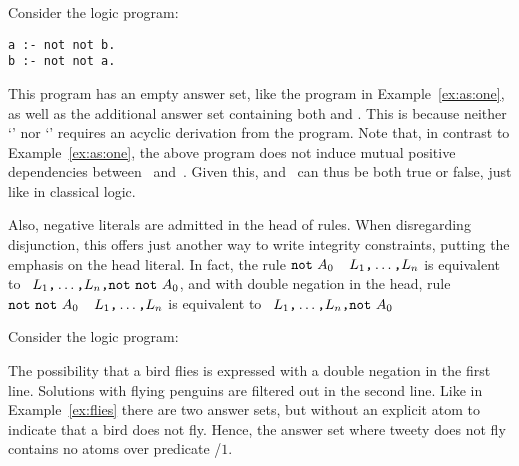 Consider the logic program:
\begin{lstlisting}[numbers=none]
a :- not not b.
b :- not not a.
\end{lstlisting}
%
This program has an empty answer set, like the program in Example~\ref{ex:as:one},
as well as the additional answer set containing both  and .
This is because neither `' nor `' requires an acyclic derivation from the program.
Note that, in contrast to Example~\ref{ex:as:one},
the above program does not induce
mutual positive dependencies between~ and~.
Given this,  and~ can thus be both true or false, just like in classical logic.

Also, negative literals are admitted in the head of rules.
When disregarding disjunction,
this offers just another way to write integrity constraints,
putting the emphasis on the head literal.
In fact, the rule
\(\texttt{not}~A_0\)~\code{:-}~\(L_1\text{\texttt{,}}\dots\text{\texttt{,}}L_n\)
is equivalent to
\code{:-}~\(L_1\text{\texttt{,}}\dots\text{\texttt{,}}L_n\text{\texttt{,}}\texttt{not}~\texttt{not}~A_0\),
and with double negation in the head, rule
\(\texttt{not}~\texttt{not}~A_0\)~\code{:-}~\(L_1\text{\texttt{,}}\dots\text{\texttt{,}}L_n\)
is equivalent to
\code{:-}~\(L_1\text{\texttt{,}}\dots\text{\texttt{,}}L_n\text{\texttt{,}}\texttt{not}~A_0\)

\begin{example}\label{ex:as:flynn}
Consider the logic program:


The possibility that a bird flies is expressed with a double negation in the first line.
Solutions with flying penguins are filtered out in the second line.
Like in Example~\ref{ex:flies} there are two answer sets,
but without an explicit atom to indicate that a bird does not fly.
Hence, the answer set where tweety does not fly contains no atoms over predicate /$1$.
\end{example}

